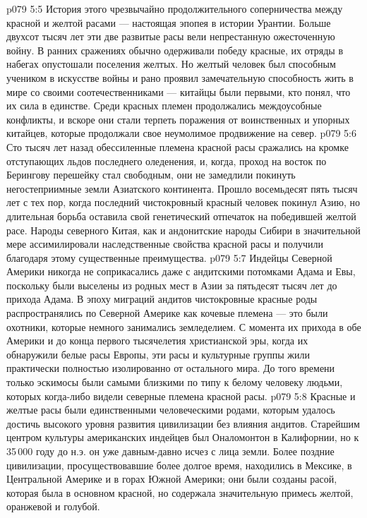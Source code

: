 \vs p079 5:5 История этого чрезвычайно продолжительного соперничества между красной и желтой расами --- настоящая эпопея в истории Урантии. Больше двухсот тысяч лет эти две развитые расы вели непрестанную ожесточенную войну. В ранних сражениях обычно одерживали победу красные, их отряды в набегах опустошали поселения желтых. Но желтый человек был способным учеником в искусстве войны и рано проявил замечательную способность жить в мире со своими соотечественниками --- китайцы были первыми, кто понял, что их сила в единстве. Среди красных племен продолжались междоусобные конфликты, и вскоре они стали терпеть поражения от воинственных и упорных китайцев, которые продолжали свое неумолимое продвижение на север.
\vs p079 5:6 \pc Сто тысяч лет назад обессиленные племена красной расы сражались на кромке отступающих льдов последнего оледенения, и, когда, проход на восток по Берингову перешейку стал свободным, они не замедлили покинуть негостеприимные земли Азиатского континента. Прошло восемьдесят пять тысяч лет с тех пор, когда последний чистокровный красный человек покинул Азию, но длительная борьба оставила свой генетический отпечаток на победившей желтой расе. Народы северного Китая, как и андонитские народы Сибири в значительной мере ассимилировали наследственные свойства красной расы и получили благодаря этому существенные преимущества.
\vs p079 5:7 Индейцы Северной Америки никогда не соприкасались даже с андитскими потомками Адама и Евы, поскольку были выселены из родных мест в Азии за пятьдесят тысяч лет до прихода Адама. В эпоху миграций андитов чистокровные красные роды распространялись по Северной Америке как кочевые племена --- это были охотники, которые немного занимались земледелием. С момента их прихода в обе Америки и до конца первого тысячелетия христианской эры, когда их обнаружили белые расы Европы, эти расы и культурные группы жили практически полностью изолированно от остального мира. До того времени только эскимосы были самыми близкими по типу к белому человеку людьми, которых когда\hyp{}либо видели северные племена красной расы.
\vs p079 5:8 Красные и желтые расы были единственными человеческими родами, которым удалось достичь высокого уровня развития цивилизации без влияния андитов. Старейшим центром культуры американских индейцев был Оналомонтон в Калифорнии, но к 35\,000 году до н.э. он уже давным\hyp{}давно исчез с лица земли. Более поздние цивилизации, просуществовавшие более долгое время, находились в Мексике, в Центральной Америке и в горах Южной Америки; они были созданы расой, которая была в основном красной, но содержала значительную примесь желтой, оранжевой и голубой.
